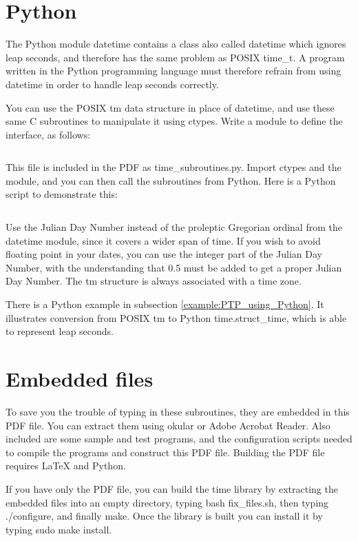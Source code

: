 \documentclass[letterpaper,twoside]{article}
\begin{document}
\section{Python}
The Python module datetime contains a class also called datetime
which ignores leap seconds, and therefore has the same problem
as POSIX {\ttfamily time\_t}.  A program written in the Python
programming language must therefore refrain from using datetime
in order to handle leap seconds correctly.

You can use the POSIX {\ttfamily tm} data structure in place of datetime,
and use these same C subroutines to manipulate it using
{\ttfamily ctypes}.
Write a module to define the interface, as follows:
\inputminted[firstline=28,lastline=367]{Python}{time_subroutines.py}
This file is included in the PDF as {\ttfamily time\_subroutines.py}.
Import ctypes and the module, and you can then call the subroutines
from Python.  Here is a Python script to demonstrate this:
\inputminted[firstline=27,lastline=92]{Python}{demo_python.py}

Use the Julian Day Number instead of the proleptic Gregorian ordinal
from the datetime module, since it covers a wider span of time.
If you wish to avoid floating point in your dates, you can use
the integer part of the Julian Day Number, with the understanding
that \num{0.5} must be added to get a proper Julian Day Number.
The {\ttfamily tm} structure is always associated with a time zone.

There is a Python example in subsection \ref{example:PTP_using_Python}.
It illustrates conversion from POSIX {\ttfamily tm} to
Python {\ttfamily time.struct\_time}, which is able to represent leap seconds.

\section{Embedded files}
\label{section:Embedded_files}
To save you the trouble of typing in these subroutines, they are embedded
in this PDF file.  You can extract them using okular or Adobe Acrobat Reader.
Also included are some sample and test programs, and the configuration
scripts needed to compile the programs and construct this PDF file.
Building the PDF file requires {\LaTeX} and Python.

If you have only the PDF file, you can build the time library by
extracting the embedded files into an empty directory,
typing {\ttfamily bash fix\_files.sh}, 
then typing {\ttfamily ./configure},
and finally {\ttfamily make}.
Once the library is built you can install it by typing
{\ttfamily sudo make install}.
\end{document}

